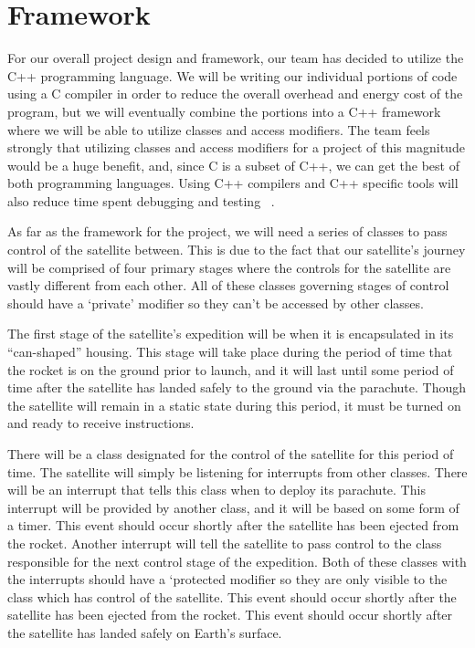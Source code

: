 \documentclass[10pt,letterpaper,onecolumn,journal]{IEEEtran}
\begin{document}
%
%
\section{Framework}
For our overall project design and framework, our team has decided to utilize the C++ programming language. We will be writing our individual portions of code using a C compiler in order to reduce the overall overhead and energy cost of the program, but we will eventually combine the portions into a C++ framework where we will be able to utilize classes and access modifiers. The team feels strongly that utilizing classes and access modifiers for a project of this magnitude would be a huge benefit, and, since C is a subset of C++, we can get the best of both programming languages. Using C++ compilers and C++ specific tools will also reduce time spent debugging and testing ~\cite{codeproject}.\vspace{.3cm}
\par 
As far as the framework for the project, we will need a series of classes to pass control of the satellite between. This is due to the fact that our satellite's journey will be comprised of four primary stages where the controls for the satellite are vastly different from each other. All of these classes governing stages of control should have a ‘private’ modifier so they can't be accessed by other classes.\vspace{.3cm}
\par 
The first stage of the satellite's expedition will be when it is encapsulated in its “can-shaped” housing. This stage will take place during the period of time that the rocket is on the ground prior to launch, and it will last until some period of time after the satellite has landed safely to the ground via the parachute. Though the satellite will remain in a static state during this period, it must be turned on and ready to receive instructions.\vspace{.3cm}
\par 
There will be a class designated for the control of the satellite for this period of time. The satellite will simply be listening for interrupts from other classes.  There will be an interrupt that tells this class when to deploy its parachute. This interrupt will be provided by another class, and it will be based on some form of a timer. This event should occur shortly after the satellite has been ejected from the rocket. Another interrupt will tell the satellite to pass control to the class responsible for the next control stage of the expedition. Both of these classes with the interrupts should have a ‘protected modifier so they are only visible to the class which has control of the satellite. This event should occur shortly after the satellite has been ejected from the rocket. This event should occur shortly after the satellite has landed safely on Earth's surface.\vspace{.3cm}
\end{document}
